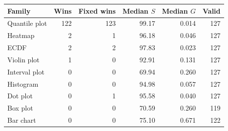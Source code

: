 \begin{tabular}{lrrrrr}\toprule
Family & Wins & Fixed wins & Median $S$ & Median $G$ & Valid\\\midrule
Quantile plot & 122 & 123 & 99.17 & 0.014 & 127\\
Heatmap & 2 & 1 & 96.18 & 0.046 & 127\\
ECDF & 2 & 2 & 97.83 & 0.023 & 127\\
Violin plot & 1 & 0 & 92.91 & 0.131 & 127\\
Interval plot & 0 & 0 & 69.94 & 0.260 & 127\\
Histogram & 0 & 0 & 94.98 & 0.057 & 127\\
Dot plot & 0 & 1 & 95.58 & 0.040 & 127\\
Box plot & 0 & 0 & 70.59 & 0.260 & 119\\
Bar chart & 0 & 0 & 75.10 & 0.671 & 122\\
\bottomrule\end{tabular}
